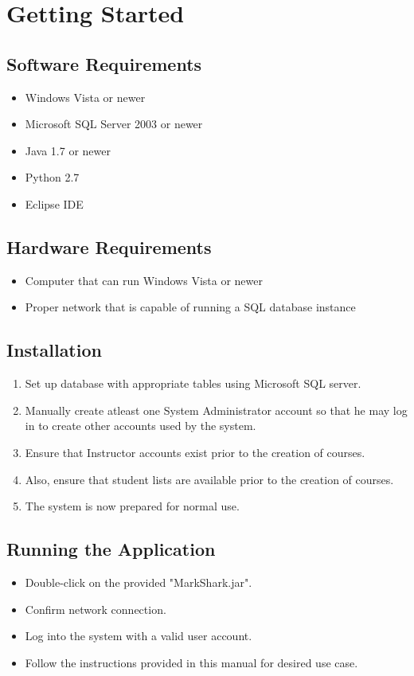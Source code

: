 \documentclass{article}
\begin{document}
\section{Getting Started}

\subsection{Software Requirements}

\begin{itemize}
	\item Windows Vista or newer
	\item Microsoft SQL Server 2003 or newer
	\item Java 1.7 or newer
	\item Python 2.7
	\item Eclipse IDE
\end{itemize}

\subsection{Hardware Requirements}
\begin{itemize}
	\item Computer that can run Windows Vista or newer
	\item Proper network that is capable of running a SQL database instance
\end{itemize}

\subsection{Installation}
\begin{enumerate}
\item Set up database with appropriate tables using Microsoft SQL server.
\item Manually create atleast one System Administrator account so that he may log in to create other accounts used by the system.
\item Ensure that Instructor accounts exist prior to the creation of courses.
\item Also, ensure that student lists are available prior to the creation of courses.
\item The system is now prepared for normal use.
\end{enumerate}


\subsection{Running the Application}
\begin{itemize}
\item Double-click on the provided "MarkShark.jar".
\item Confirm network connection.
\item Log into the system with a valid user account.
\item Follow the instructions provided in this manual for desired use case.
\end{itemize}
\end{document}
